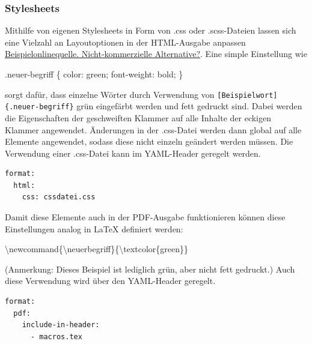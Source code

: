 \documentclass[
  letterpaper,
  DIV=11]{scrartcl}
\newenvironment{Shaded}{\begin{snugshade}}{\end{snugshade}}
\newcommand{\CharTok}[1]{\textcolor[rgb]{0.13,0.47,0.30}{#1}}
\newcommand{\ConstantTok}[1]{\textcolor[rgb]{0.56,0.35,0.01}{#1}}
\newcommand{\DecValTok}[1]{\textcolor[rgb]{0.68,0.00,0.00}{#1}}
\newcommand{\ExtensionTok}[1]{\textcolor[rgb]{0.00,0.23,0.31}{#1}}
\newcommand{\FunctionTok}[1]{\textcolor[rgb]{0.28,0.35,0.67}{#1}}
\newcommand{\KeywordTok}[1]{\textcolor[rgb]{0.00,0.23,0.31}{#1}}
\newcommand{\NormalTok}[1]{\textcolor[rgb]{0.00,0.23,0.31}{#1}}
\newcommand{\OperatorTok}[1]{\textcolor[rgb]{0.37,0.37,0.37}{#1}}
\begin{document}
\subsubsection{Stylesheets}\label{stylesheets}

Mithilfe von eigenen Stylesheets in Form von .css oder .scss-Dateien
lassen sich eine Vielzahl an Layoutoptionen in der HTML-Ausgabe anpassen
\href{https://www.w3schools.com/css/css_text.asp}{Beispielonlinequelle.
Nicht-kommerzielle Alternative?}. Eine simple Einstellung wie

\begin{Shaded}
\begin{Highlighting}[]
\FunctionTok{.neuer{-}begriff}\NormalTok{ \{ }
    \KeywordTok{color}\CharTok{:} \ConstantTok{green}\OperatorTok{;} 
    \KeywordTok{font{-}weight}\CharTok{:} \DecValTok{bold}\OperatorTok{;} 
\NormalTok{\}}
\end{Highlighting}
\end{Shaded}

sorgt dafür, dass einzelne Wörter durch Verwendung von
\texttt{{[}Beispielwort{]}\{.neuer-begriff\}} grün eingefärbt werden und
fett gedruckt sind. Dabei werden die Eigenschaften der geschweiften
Klammer auf alle Inhalte der eckigen Klammer angewendet. Änderungen in
der .css-Datei werden dann global auf alle Elemente angewendet, sodass
diese nicht einzeln geändert werden müssen. Die Verwendung einer
.css-Datei kann im YAML-Header geregelt werden.

\begin{verbatim}
format:
  html: 
    css: cssdatei.css
\end{verbatim}

Damit diese Elemente auch in der PDF-Ausgabe funktionieren können diese
Einstellungen analog in LaTeX definiert werden:

\begin{Shaded}
\begin{Highlighting}[]
\FunctionTok{\textbackslash{}newcommand}\NormalTok{\{}\ExtensionTok{\textbackslash{}neuerbegriff}\NormalTok{\}\{}\FunctionTok{\textbackslash{}textcolor}\NormalTok{\{green\}\}}
\end{Highlighting}
\end{Shaded}

(Anmerkung: Dieses Beispiel ist lediglich grün, aber nicht fett
gedruckt.) Auch diese Verwendung wird über den YAML-Header geregelt.

\begin{verbatim}
format:
  pdf: 
    include-in-header:
      - macros.tex
\end{verbatim}
\end{document}
